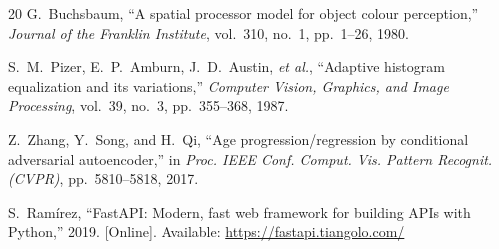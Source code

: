 \documentclass[conference]{IEEEtran}
\begin{document}
\begin{thebibliography}{20}
G.~Buchsbaum, ``A spatial processor model for object colour perception,'' \textit{Journal of the Franklin Institute}, vol.~310, no.~1, pp.~1--26, 1980.

S.~M.~Pizer, E.~P.~Amburn, J.~D.~Austin, \textit{et al.}, ``Adaptive histogram equalization and its variations,'' \textit{Computer Vision, Graphics, and Image Processing}, vol.~39, no.~3, pp.~355--368, 1987.

Z.~Zhang, Y.~Song, and H.~Qi, ``Age progression/regression by conditional adversarial autoencoder,'' in \textit{Proc. IEEE Conf. Comput. Vis. Pattern Recognit. (CVPR)}, pp.~5810--5818, 2017.

S.~Ram\'irez, ``FastAPI: Modern, fast web framework for building APIs with Python,'' 2019. [Online]. Available: \url{https://fastapi.tiangolo.com/}

\end{thebibliography}
\end{document}
